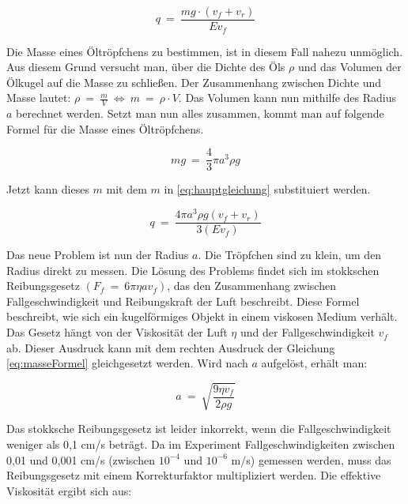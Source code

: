 \begin{equation}\label{eq:hauptgleichung}
	q \ = \ \frac{mg \cdot (v_f + v_r)}{Ev_f}
\end{equation}

\noindent Die Masse eines Öltröpfchens zu bestimmen, ist in diesem Fall nahezu unmöglich. Aus diesem Grund versucht man, über die Dichte des Öls $\rho$ und das Volumen der Ölkugel auf die Masse zu schließen. Der Zusammenhang zwischen Dichte und Masse lautet: $\rho \ = \ \frac{m}{V} \ \Leftrightarrow \ m \ = \ \rho \cdot V$. Das Volumen kann nun mithilfe des Radius $a$ berechnet werden. Setzt man nun alles zusammen, kommt man auf folgende Formel für die Masse eines Öltröpfchens. 

\begin{equation}\label{eq:masseFormel}
	mg \ = \ \frac{4}{3} \pi a^3 \rho g
\end{equation}

\noindent Jetzt kann dieses $m$ mit dem $m$ in \autoref{eq:hauptgleichung} substituiert werden.

\begin{equation}\label{eq:ladungFormel}
	q \ = \ \frac{4\pi a^3\rho g (v_f + v_r)}{3(Ev_f)}
\end{equation}

\noindent Das neue Problem ist nun der Radius $a$. Die Tröpfchen sind zu klein, um den Radius direkt zu messen. Die Lösung des Problems findet sich im stokkschen Reibungsgesetz $(F_f \ = \ 6\pi \eta a v_f)$, das den Zusammenhang zwischen Fallgeschwindigkeit und Reibungskraft der Luft beschreibt. Diese Formel beschreibt, wie sich ein kugelförmiges Objekt in einem viskosen Medium verhält. Das Gesetz hängt von der Viskosität der Luft $\eta$ und der Fallgeschwindigkeit $v_f$ ab. Dieser Ausdruck kann mit dem rechten Ausdruck der Gleichung \ref{eq:masseFormel} gleichgesetzt werden. Wird nach $a$ aufgelöst, erhält man:

\begin{equation}\label{eq:stokesRadius}
	a \ = \ \sqrt{\frac{9\eta v_f}{2\rho g}}
\end{equation}

\noindent Das stokksche Reibungsgesetz ist leider inkorrekt, wenn die Fallgeschwindigkeit weniger als 0,1 cm/s beträgt. Da im Experiment Fallgeschwindigkeiten zwischen 0,01 und 0,001 cm/s (zwischen $10^{-4}$ und $10^{-6}$ m/s) gemessen werden, muss das Reibungsgesetz mit einem Korrekturfaktor multipliziert werden. Die effektive Viskosität ergibt sich aus:

